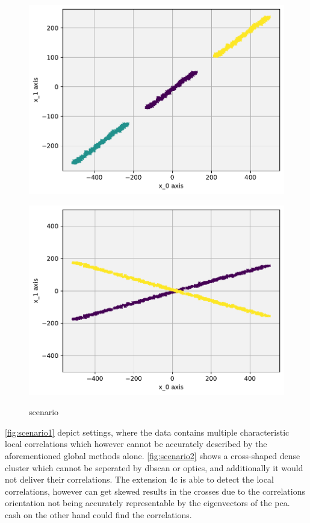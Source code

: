 \begin{figure}
    \centering
    \begin{minipage}{.5\textwidth}
      \centering
      \includegraphics[width=.8\textwidth]{figures_method/piecewisecorrs.pdf}
      \label{fig:scenario1}
    \end{minipage}%
    \begin{minipage}{.5\textwidth}
      \centering
      \includegraphics[width=.8\textwidth]{figures_method/xcorrs.pdf}
      \label{fig:scenario2}
    \end{minipage}
    \caption{scenario}
    \label{fig:badscenario}
\end{figure}
\autoref{fig:scenario1}  depict settings, where the data contains multiple characteristic local correlations which however cannot be accurately described by the aforementioned global methods alone. \autoref{fig:scenario2} shows a cross-shaped dense cluster which cannot be seperated by \gls{dbscan} or \gls{optics}, and additionally it would not deliver their correlations. The extension \gls{4c} is able to detect the local correlations, however can get skewed results in the crosses due to the correlations orientation not being accurately representable by the eigenvectors of the \gls{pca}\cite{PCAshlens2014tutorial}. 
\gls{cash} on the other hand could find the correlations. 

